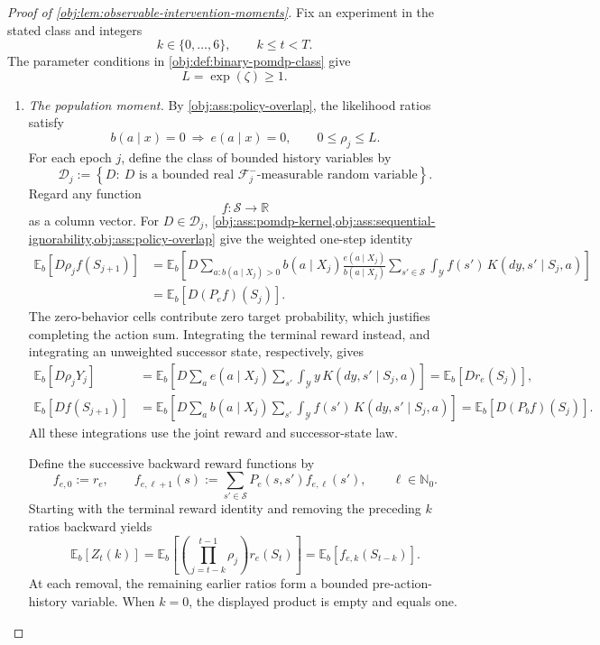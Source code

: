 \documentclass[11pt]{article}
\begin{document}
\begin{proof}[Proof of \cref{obj:lem:observable-intervention-moments}]
Fix an experiment in the stated class and integers
\[
k\in\{0,\ldots,6\},\qquad k\le t<T.
\]
The parameter conditions in \cref{obj:def:binary-pomdp-class} give
\[
L=\exp(\zeta)\ge1.
\]

\begin{enumerate}
\item \emph{The population moment.}
By \cref{obj:ass:policy-overlap}, the likelihood ratios satisfy
\[
b(a\mid x)=0\ \Longrightarrow\ e(a\mid x)=0,
\qquad
0\le\rho_j\le L.
\]
For each epoch \(j\), define the class of bounded history variables by
\[
\mathcal D_j
:=
\left\{
D:\ D\text{ is a bounded real }
\mathcal F_j^-\text{-measurable random variable}
\right\}.
\]
Regard any function
\[
f:\mathcal S\longrightarrow\mathbb R
\]
as a column vector. For \(D\in\mathcal D_j\),
\cref{obj:ass:pomdp-kernel,obj:ass:sequential-ignorability,obj:ass:policy-overlap}
give the weighted one-step identity
\[
\begin{aligned}
\mathbb E_b[D\rho_j f(S_{j+1})]
&=
\mathbb E_b\!\left[
D\sum_{a:b(a\mid X_j)>0}
b(a\mid X_j)\frac{e(a\mid X_j)}{b(a\mid X_j)}
\sum_{s'\in\mathcal S}\int_{\mathcal Y}
f(s')\,K(dy,s'\mid S_j,a)
\right]\\
&=
\mathbb E_b[D(P_ef)(S_j)].
\end{aligned}
\]
The zero-behavior cells contribute zero target probability, which justifies completing the action sum. Integrating the terminal reward instead, and integrating an unweighted successor state, respectively, gives
\[
\begin{aligned}
\mathbb E_b[D\rho_jY_j]
&=
\mathbb E_b\!\left[
D\sum_a e(a\mid X_j)
\sum_{s'}\int_{\mathcal Y}y\,K(dy,s'\mid S_j,a)
\right]
=\mathbb E_b[Dr_e(S_j)],\\
\mathbb E_b[Df(S_{j+1})]
&=
\mathbb E_b\!\left[
D\sum_a b(a\mid X_j)
\sum_{s'}\int_{\mathcal Y}f(s')\,K(dy,s'\mid S_j,a)
\right]
=\mathbb E_b[D(P_bf)(S_j)].
\end{aligned}
\]
All these integrations use the joint reward and successor-state law.

Define the successive backward reward functions by
\[
f_{e,0}:=r_e,\qquad
f_{e,\ell+1}(s):=\sum_{s'\in\mathcal S}P_e(s,s')f_{e,\ell}(s'),
\qquad \ell\in\mathbb N_0.
\]
Starting with the terminal reward identity and removing the preceding \(k\) ratios backward yields
\[
\mathbb E_b[Z_t(k)]
=
\mathbb E_b\!\left[
\left(\prod_{j=t-k}^{t-1}\rho_j\right)r_e(S_t)
\right]
=
\mathbb E_b[f_{e,k}(S_{t-k})].
\]
At each removal, the remaining earlier ratios form a bounded pre-action-history variable. When \(k=0\), the displayed product is empty and equals one.


\end{enumerate}
\end{proof}
\end{document}
